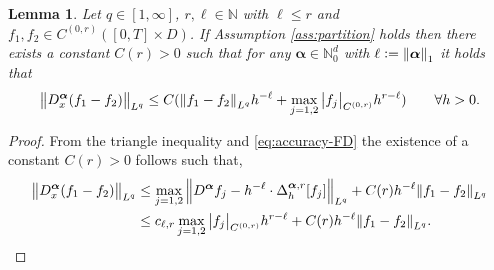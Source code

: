 \documentclass{article}
\numberwithin{equation}{section}
\newcommand{\N}{\mathbb{N}}
\newcommand{\bmalpha}{{\bm{\alpha}}}
\newcommand{\1}{\mathbbm{1}}
\newtheorem{lemma}[theorem]{Lemma}
\begin{document}
\begin{lemma}\label{lem:derivatives}
Let $q\in [1,\infty]$, $r, \ell\in\N$ with $\ell\leq r$ and $f_1, f_2 \in C^{(0,r)}([0,T]\times D)$. If Assumption \ref{ass:partition} holds then there exists a constant $C(r)>0$ such that for any $\bmalpha\in\N^d_0$ with $\ell := \norm{\bmalpha}_1$ it holds that
\begin{equation}
    \norm{D^\bmalpha_x (f_1-f_2)}_{L^q} \leq C(\norm{f_1-f_2}_{L^q}h^{-\ell} + \max_{j=1,2}\abs{f_j}_{C^{(0,r)}}h^{r-\ell})\qquad \forall h>0.
\end{equation}
\end{lemma}
\begin{proof}
From the triangle inequality and \eqref{eq:accuracy-FD} the existence of a constant $C(r)>0$ follows such that,
\begin{equation}
    \begin{split}
        \norm{D^\bmalpha_x (f_1-f_2)}_{L^q} &\leq  \max_{j=1,2} \norm{D^\bmalpha f_j-h^{-\ell}\cdot\Delta^{\bmalpha,r}_h[f_j]}_{L^q} + C(r) h^{-\ell} \norm{f_1-f_2}_{L^q} \\
            &\leq c_{\ell,r} \max_{j=1,2} \abs{f_j}_{C^{(0,r)}} h^{r-\ell} + C(r) h^{-\ell} \norm{f_1-f_2}_{L^q}.\qedhere
    \end{split}
\end{equation}
\end{proof}
\end{document}
